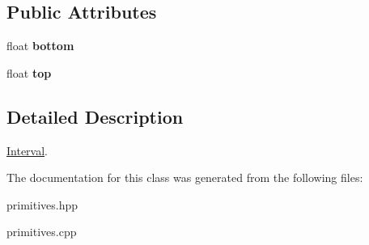 \subsection*{Public Attributes}
\begin{DoxyCompactItemize}
\item 
\mbox{\label{classInterval_a77635f902708975db1aab1204e6ba742}} 
float {\bfseries bottom}
\item 
\mbox{\label{classInterval_ad7405ca3f092fdae98971e38c95ece4f}} 
float {\bfseries top}
\end{DoxyCompactItemize}


\subsection{Detailed Description}
\hyperlink{classInterval}{Interval}. 

The documentation for this class was generated from the following files\+:\begin{DoxyCompactItemize}
\item 
primitives.\+hpp\item 
primitives.\+cpp\end{DoxyCompactItemize}
